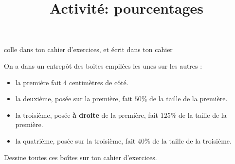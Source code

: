 \documentclass[a4paper,12pt]{article}
\title{Activité: pourcentages}
\date{}
\author{}
\makeatletter
\renewcommand{\maketitle}{%
{\scriptsize colle dans ton cahier d'exercices, et écrit dans ton cahier} \vspace{0.5em}

	\begin{center}
		\LARGE
		\myuline{\@title}
	\end{center}
}
\makeatother
\begin{document}
\maketitle

\begin{attention}[frametitle={Exercice 1}]
	On a dans un entrepôt des boites empilées les unes sur les autres :

	\begin{itemize}
		\item la première fait 4 centimètres de côté.
		\item la deuxième, posée sur la première, fait $50\%$ de la taille de la première.
		\item la troisième, posée \textbf{à droite} de la première, fait $125\%$ de la taille de la première.
		\item la quatrième, posée sur la troisième, fait $40\%$ de la taille de la troisième.
	\end{itemize}

	Dessine toutes ces boîtes sur ton cahier d'exercices.
\end{attention}
\end{document}
